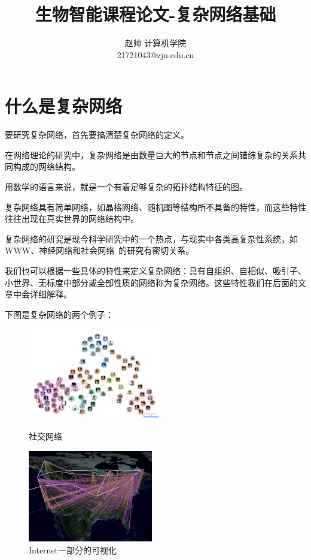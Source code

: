\documentclass[11pt]{article}
\title{ \textbf{生物智能课程论文-复杂网络基础} }
\author{
	赵帅  \qquad 计算机学院  \qquad 21721043\\
	21721043@zju.edu.cn
}
\date{ }
\begin{document}
	
	\maketitle
	\section{什么是复杂网络}
		要研究复杂网络，首先要搞清楚复杂网络的定义。\par
		在网络理论的研究中，复杂网络是由数量巨大的节点和节点之间错综复杂的关系共同构成的网络结构。 \par
		用数学的语言来说，就是一个有着足够复杂的拓扑结构特征的图。\par
		复杂网络具有简单网络，如晶格网络、随机图等结构所不具备的特性，而这些特性往往出现在真实世界的网络结构中。\par
		复杂网络的研究是现今科学研究中的一个热点，与现实中各类高复杂性系统，如WWW、神经网络和社会网络~\cite{paper_01}的研究有密切关系。 \par
		我们也可以根据一些具体的特性来定义复杂网络：具有自组织、自相似、吸引子、小世界、无标度中部分或全部性质的网络称为复杂网络。这些特性我们在后面的文章中会详细解释。 \par
		下图是复杂网络的两个例子：
		
		\begin{figure}[htbp]
			\centering
			\begin{minipage}[t]{0.45\textwidth}
				\centering
				\includegraphics[height=4cm]{pic/01-social.png}
				\caption{社交网络}
			\end{minipage}
			\begin{minipage}[t]{0.45\textwidth}
				\centering
				\includegraphics[height=4cm]{pic/01-internet.jpg}
				\caption{Internet一部分的可视化}
			\end{minipage}
		\end{figure}
		
\end{document}
